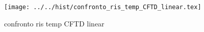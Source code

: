\begin{figure}[h] \centering\texttt{[image: ../../hist/confronto\_ris\_temp\_CFTD\_linear.tex]}\caption{confronto ris temp CFTD linear}\label{hist:confronto_ris_temp_CFTD_linear} \end{figure}
